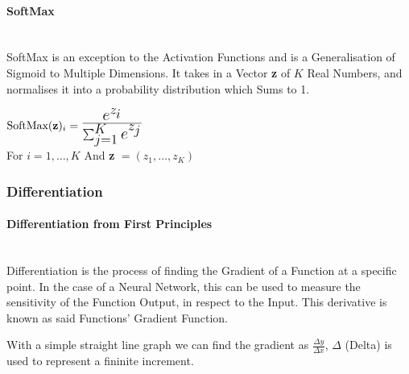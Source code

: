\begin{flushleft}
                \paragraph{SoftMax} \mbox{} \\
                    SoftMax is an exception to the Activation Functions and is a Generalisation of Sigmoid to Multiple Dimensions. It
                    takes in a Vector \textbf{z} of $K$ Real Numbers, and normalises it into a probability distribution which Sums to 1. \\ 

                    \begin{center}
                        \begin{math}
                            \text{SoftMax}(\textbf{z})_{i} = \mathLarge{\frac{e^{z_{i}}}{\sum_{j=1}^{K} e^{z_{j}}}}
                        \end{math} \\
                        \vspace{0.2cm}
                        For $i = 1, \hdots,K$ And \textbf{z} $ = (z_{1},\hdots,z_{K})$ \\
                    \end{center}
                    
            \subsubsection{Differentiation}
                \paragraph{Differentiation from First Principles}  \mbox{} \\
                    \vspace{0.2cm}
                    Differentiation is the process of finding the Gradient of a Function at a specific point. In the case of a Neural Network,
                    this can be used to measure the sensitivity of the Function Output, in respect to the Input. This derivative is known as said 
                    Functions' Gradient Function. \\
                    \vspace{0.2cm}
                    
                    With a simple straight line graph we can find the gradient as {\Large$\frac{\Delta y}{\Delta x}$, $\Delta$} (Delta) is used to 
                    represent a fininite increment. \\
                    \vspace{0.2cm}


\end{flushleft}
